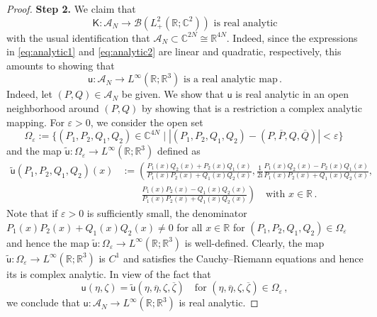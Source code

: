 \documentclass[11pt,reqno]{amsart}
\theoremstyle{definition}
\theoremstyle{remark}
\theoremstyle{remark}
\numberwithin{equation}{section}
\newcommand{\C}{\mathbb{C}}
\newcommand{\R}{\mathbb{R}}
\newcommand{\ov}{\overline}
\newcommand{\eps}{\varepsilon}
\newcommand{\ii}{\mathrm{i}}
\newcommand{\uu}{\mathbf{u}}
\begin{document}
\begin{proof}
\medskip
\textbf{Step 2.} We claim that 
$$
\mbox{$\mathsf{K} : \mathcal{A}_N \to \mathcal{B}(L^2_+(\R; \C^2))$ is real analytic} 
$$
with the usual identification that $\mathcal{A}_N \subset \C^{2N} \cong \R^{4N}$. Indeed, since the expressions in \eqref{eq:analytic1} and \eqref{eq:analytic2} are linear and quadratic, respectively, this amounts to showing that
$$
\mbox{$\mathsf{u} : \mathcal{A}_N \to L^\infty(\R; \R^3)$ is a real analytic map} \, .
$$
Indeed, let $(P,Q) \in \mathcal{A}_N$ be given. We show that $\mathsf{u}$ is real analytic in an open neighborhood around $(P,Q)$  by showing that is a restriction a complex analytic mapping. For $\eps > 0$, we consider the open set
$$
\Omega_{\eps} := \{ (P_1, P_2, Q_1, Q_2) \in \C^{4N} \mid |(P_1,P_2, Q_1, Q_2) - (P,\ov{P}, Q, \ov{Q})| < \eps \} \
$$
and the map $\tilde{\mathsf{u}} : \Omega_\eps \to L^\infty(\R; \R^3)$ defined as
\begin{align*}
\tilde{\mathsf{u}}(P_1, P_2, Q_1, Q_2)(x) & := \left ( \frac{ P_1(x) Q_2(x) + P_2(x) Q_1(x)}{P_1(x) P_2(x) + Q_1(x) Q_2(x)}, \frac{1}{2 \ii} \frac{P_1(x) Q_2(x)-P_2(x) Q_1(x)}{  P_1(x) P_2(x) + Q_1(x) Q_2(x)}, \right . \\
& \qquad \left . \frac{P_1(x) P_2(x) - Q_1(x) Q_2(x)}{P_1(x) P_2(x) + Q_1(x) Q_2(x)} \right ) \quad \mbox{with $x \in \R$} \, .
\end{align*}
Note that if $\eps > 0$ is sufficiently small, the denominator $P_1(x) P_2(x) + Q_1(x) Q_2(x) \neq 0$ for all $x \in \R$ for $(P_1,P_2,Q_1, Q_2) \in \Omega_\eps$ and hence the map $\tilde{\mathsf{u} }: \Omega_\eps \to L^\infty(\R; \R^3)$ is well-defined. Clearly, the map $\tilde{\mathsf{u}} : \Omega_\eps \to L^\infty(\R; \R^3)$ is $C^1$ and satisfies the Cauchy--Riemann equations and hence its is complex analytic. In view of the fact that
$$
\mathsf{u}(\eta,\zeta) = \tilde{\mathsf{u}}(\eta,\ov{\eta}, \zeta, \ov{\zeta}) \quad \mbox{for $(\eta, \ov{\eta}, \zeta, \ov{\zeta}) \in \Omega_\eps$} \, ,
$$
we conclude that $\mathsf{u} : \mathcal{A}_N \to L^\infty(\R; \R^3)$ is real analytic.


\end{proof}
\end{document}
